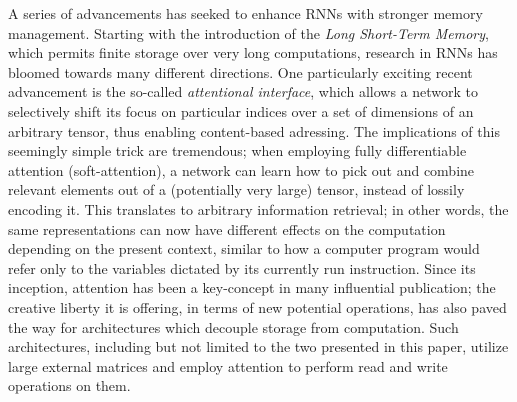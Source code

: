 \documentclass[]{article}
\begin{document}
A series of advancements has seeked to enhance RNNs with stronger memory management. Starting with the introduction of the \textit{Long Short-Term Memory}, which permits finite storage over very long computations, research in RNNs has bloomed towards many different directions. One particularly exciting recent advancement is the so-called \textit{attentional interface}, which allows a network to selectively shift its focus on particular indices over a set of dimensions of an arbitrary tensor, thus enabling content-based adressing. The implications of this seemingly simple trick are tremendous; when employing fully differentiable attention (soft-attention), a network can learn how to pick out and combine relevant elements out of a (potentially very large) tensor, instead of lossily encoding it. This translates to arbitrary information retrieval; in other words, the same representations can now have different effects on the computation depending on the present context, similar to how a computer program would refer only to the variables dictated by its currently run instruction. Since its inception, attention has been a key-concept in many influential publication; the creative liberty it is offering, in terms of new potential operations, has also paved the way for architectures which decouple storage from computation. Such architectures, including but not limited to the two presented in this paper, utilize large external matrices and employ attention to perform read and write operations on them.
\end{document}
